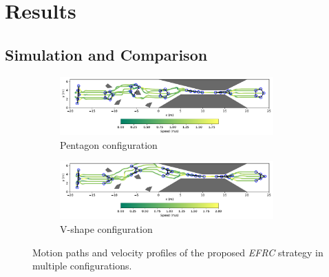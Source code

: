 \section{Results}\label{sec4}
\subsection{Simulation and Comparison}
\begin{figure}[!h]
\begin{subfigure}[b]{\textwidth}
    
    \centering
    \includegraphics[width=0.9\textwidth]{paper2/images/path_edc_shape1.pdf}
    \caption{Pentagon configuration}
    \label{fig:1path_edc1}
\end{subfigure}
\begin{subfigure}[b]{\textwidth}
    \centering
    \includegraphics[width=0.9\textwidth]{paper2/images/path_edc_shape2.pdf}
    \caption{V-shape configuration}
    \label{fig:1path_edc2}
\end{subfigure}
\caption{Motion paths and velocity profiles of the proposed \textit{EFRC} strategy in multiple configurations.}
\label{fig:1path}
\end{figure}

